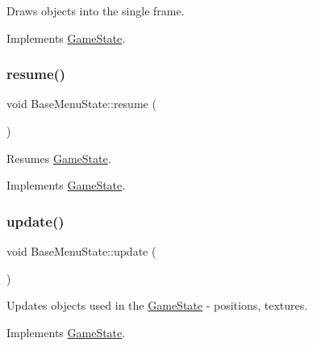 Draws objects into the single frame. 



Implements \mbox{\hyperlink{class_game_state_a0d56cd5355f59a87cf95e1c6d719f329}{Game\+State}}.

\mbox{\label{class_base_menu_state_a8b0bba27d448b83a1f8f4ceca8dde07e}} 
\subsubsection{\texorpdfstring{resume()}{resume()}}
{\footnotesize\ttfamily void Base\+Menu\+State\+::resume (\begin{DoxyParamCaption}{ }\end{DoxyParamCaption})\hspace{0.3cm}{\ttfamily [virtual]}}



Resumes \mbox{\hyperlink{class_game_state}{Game\+State}}. 



Implements \mbox{\hyperlink{class_game_state_a4a421c44f4dae6e9a4fbe10b6e8c47ac}{Game\+State}}.

\mbox{\label{class_base_menu_state_abfc8c5d2c7c3811443fc79a107a5936e}} 
\subsubsection{\texorpdfstring{update()}{update()}}
{\footnotesize\ttfamily void Base\+Menu\+State\+::update (\begin{DoxyParamCaption}\item[{\mbox{\hyperlink{class_game_engine}{Game\+Engine}} $\ast$}]{ }\end{DoxyParamCaption})\hspace{0.3cm}{\ttfamily [virtual]}}



Updates objects used in the \mbox{\hyperlink{class_game_state}{Game\+State}} -\/ positions, textures. 



Implements \mbox{\hyperlink{class_game_state_a66b11afe355a9479f94aaf76576980bd}{Game\+State}}.



